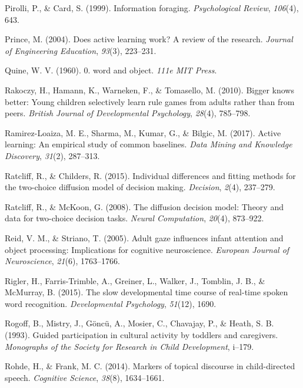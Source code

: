 \documentclass[oneside]{report}
\begin{document}
\hypertarget{ref-pirolli1999information}{}
Pirolli, P., \& Card, S. (1999). Information foraging.
\emph{Psychological Review}, \emph{106}(4), 643.

\hypertarget{ref-prince2004does}{}
Prince, M. (2004). Does active learning work? A review of the research.
\emph{Journal of Engineering Education}, \emph{93}(3), 223--231.

\hypertarget{ref-quine19600}{}
Quine, W. V. (1960). 0. word and object. \emph{111e MIT Press}.

\hypertarget{ref-rakoczy2010bigger}{}
Rakoczy, H., Hamann, K., Warneken, F., \& Tomasello, M. (2010). Bigger
knows better: Young children selectively learn rule games from adults
rather than from peers. \emph{British Journal of Developmental
Psychology}, \emph{28}(4), 785--798.

\hypertarget{ref-ramirez2017active}{}
Ramirez-Loaiza, M. E., Sharma, M., Kumar, G., \& Bilgic, M. (2017).
Active learning: An empirical study of common baselines. \emph{Data
Mining and Knowledge Discovery}, \emph{31}(2), 287--313.

\hypertarget{ref-ratcliff2015individual}{}
Ratcliff, R., \& Childers, R. (2015). Individual differences and fitting
methods for the two-choice diffusion model of decision making.
\emph{Decision}, \emph{2}(4), 237--279.

\hypertarget{ref-ratcliff2008diffusion}{}
Ratcliff, R., \& McKoon, G. (2008). The diffusion decision model: Theory
and data for two-choice decision tasks. \emph{Neural Computation},
\emph{20}(4), 873--922.

\hypertarget{ref-reid2005adult}{}
Reid, V. M., \& Striano, T. (2005). Adult gaze influences infant
attention and object processing: Implications for cognitive
neuroscience. \emph{European Journal of Neuroscience}, \emph{21}(6),
1763--1766.

\hypertarget{ref-rigler2015slow}{}
Rigler, H., Farris-Trimble, A., Greiner, L., Walker, J., Tomblin, J. B.,
\& McMurray, B. (2015). The slow developmental time course of real-time
spoken word recognition. \emph{Developmental Psychology}, \emph{51}(12),
1690.

\hypertarget{ref-rogoff1993guided}{}
Rogoff, B., Mistry, J., Göncü, A., Mosier, C., Chavajay, P., \& Heath,
S. B. (1993). Guided participation in cultural activity by toddlers and
caregivers. \emph{Monographs of the Society for Research in Child
Development}, i--179.

\hypertarget{ref-rohde2014markers}{}
Rohde, H., \& Frank, M. C. (2014). Markers of topical discourse in
child-directed speech. \emph{Cognitive Science}, \emph{38}(8),
1634--1661.
\end{document}
